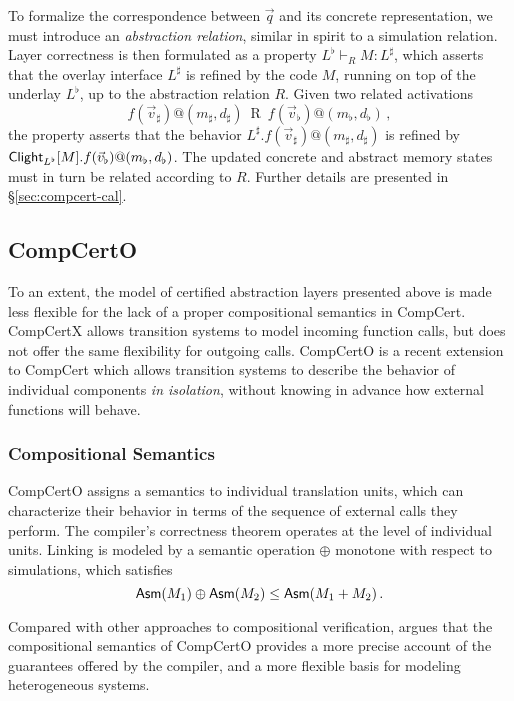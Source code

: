 \documentclass[acmsmall,review,anonymous]{acmart}\settopmatter{printfolios=true,printccs=false,printacmref=false}
\begin{document}
To formalize the correspondence between $\vec{q}$
and its concrete representation,
we must introduce an \emph{abstraction relation},
similar in spirit to a simulation relation.
Layer correctness is then formulated as a property
$L^\flat \vdash_R M : L^\sharp$,
which asserts that
the overlay interface $L^\sharp$ is refined by
the code $M$,
running on top of the underlay $L^\flat$,
up to the abstraction relation $R$.
Given two related activations
\[
  f(\vec{v}_\sharp)@(m_\sharp, d_\sharp)
  \:\mathrel{R}\:
  f(\vec{v}_\flat)@(m_\flat, d_\flat)
  \,,
\]
the property asserts that the behavior
$L^\sharp.f(\vec{v}_\sharp)@(m_\sharp, d_\sharp)$
is refined by
$ \mathsf{Clight} _{L^\flat}[M].f(\vec{v}_\flat)@(m_\flat, d_\flat)$.
The updated concrete and abstract memory states
must in turn be related according to $R$.
Further details are presented in \S\ref{sec:compcert-cal}.


\subsection{CompCertO} \label{sec:mainideas:compcerto} %

To an extent,
the model of certified abstraction layers presented above
is made less flexible for the lack of a proper
compositional semantics in CompCert.
CompCertX allows transition systems
to model incoming function calls,
but does not offer the same flexibility for outgoing calls.
CompCertO is a recent extension to CompCert
which allows transition systems
to describe the behavior of individual components \emph{in isolation},
without knowing in advance how external functions will behave.

\subsubsection{Compositional Semantics} %

CompCertO assigns a semantics to individual translation units,
which can characterize their behavior
in terms of the sequence of external calls they perform.
The compiler's correctness theorem
operates at the level of individual units.
Linking is modeled by a semantic operation $\oplus$
monotone with respect to simulations,
which satisfies
\[
   \mathsf{Asm} (M_1) \oplus  \mathsf{Asm} (M_2) \le
   \mathsf{Asm} (M_1 + M_2)
  \,.
\]

Compared with other approaches to compositional verification,
\citet{compcerto} argues that
the compositional semantics of CompCertO
provides a more precise account 
of the guarantees offered by the compiler,
and a more flexible basis
for modeling heterogeneous systems.
\end{document}
